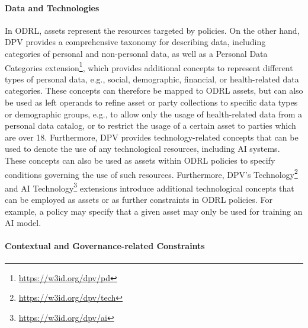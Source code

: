 \paragraph{Data and Technologies}

In ODRL,
assets represent the resources targeted by policies.
On the other hand,
DPV provides a comprehensive taxonomy for describing data,
including categories of personal and non-personal data,
as well as a Personal Data Categories extension\footnote{
    \url{https://w3id.org/dpv/pd}},
which provides additional concepts to represent different types of personal data,
e.g., social, demographic, financial, or health-related data categories.
These concepts can therefore be mapped to ODRL assets,
but can also be used as left operands to refine asset or party collections
to specific data types or demographic groups, e.g.,
to allow only the usage of health-related data from a personal data catalog, or
to restrict the usage of a certain asset to parties which are over 18.
Furthermore,
DPV provides technology-related concepts
that can be used to denote the use of any technological resources,
including AI systems.
These concepts can also be used as assets within ODRL policies
to specify conditions governing the use of such resources.
Furthermore, DPV's Technology\footnote{
    \url{https://w3id.org/dpv/tech}}
and AI Technology\footnote{
    \url{https://w3id.org/dpv/ai}}
extensions introduce additional technological concepts
that can be employed as assets or as further constraints in ODRL policies.
For example,
a policy may specify that a given asset may only be used for training an AI model.

\paragraph{Contextual and Governance-related Constraints}


